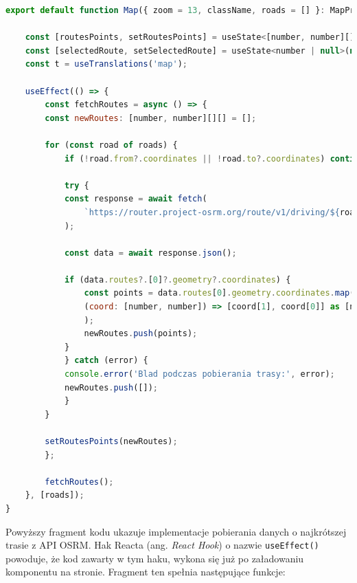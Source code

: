 \pagebreak
{\belowcaptionskip=-9pt
\begin{lstlisting}[language=JavaScript,caption=Implementacja pobierania najkrótszych tras między punktami, label=lst:fetchRoutes]
export default function Map({ zoom = 13, className, roads = [] }: MapProps) {
    
    const [routesPoints, setRoutesPoints] = useState<[number, number][][]>([]);
    const [selectedRoute, setSelectedRoute] = useState<number | null>(null);
    const t = useTranslations('map');

    useEffect(() => {
        const fetchRoutes = async () => {
        const newRoutes: [number, number][][] = [];
    
        for (const road of roads) {
            if (!road.from?.coordinates || !road.to?.coordinates) continue;
    
            try {
            const response = await fetch(
                `https://router.project-osrm.org/route/v1/driving/${road.from.coordinates[1]},${road.from.coordinates[0]};${road.to.coordinates[1]},${road.to.coordinates[0]}?overview=full&geometries=geojson`,
            );
    
            const data = await response.json();
    
            if (data.routes?.[0]?.geometry?.coordinates) {
                const points = data.routes[0].geometry.coordinates.map(
                (coord: [number, number]) => [coord[1], coord[0]] as [number, number],
                );
                newRoutes.push(points);
            }
            } catch (error) {
            console.error('Blad podczas pobierania trasy:', error);
            newRoutes.push([]);
            }
        }
    
        setRoutesPoints(newRoutes);
        };
    
        fetchRoutes();
    }, [roads]);
}
  \end{lstlisting}
}
  \pagebreak
  Powyższy fragment kodu ukazuje implementacje pobierania danych o najkrótszej trasie z API OSRM. Hak Reacta (ang. \emph{React Hook}) o nazwie \texttt{useEffect()} powoduje, że kod zawarty w tym haku, wykona się już po załadowaniu komponentu na stronie. Fragment ten spełnia następujące funkcje:
